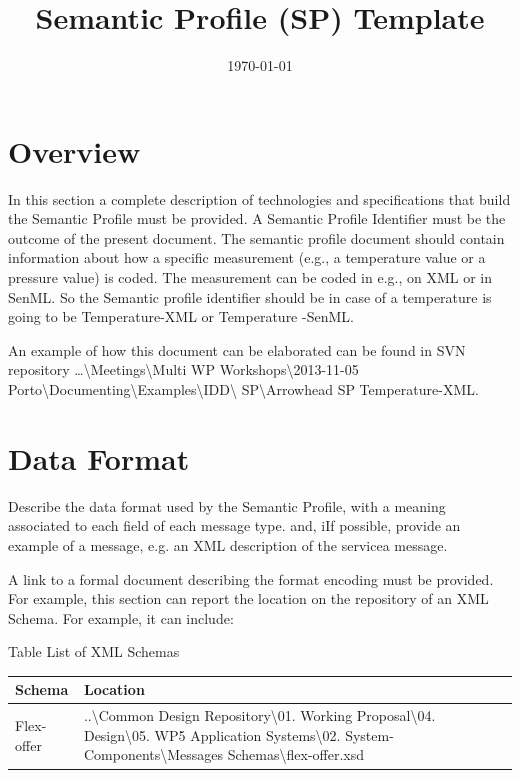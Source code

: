 \documentclass{article}
\date{\today} & 1.2 \\
\title{Semantic Profile (SP) Template}
\newcounter{Table}
\renewcommand\theTable{\arabic{Table}}
\begin{document}
\maketitle
\tableofcontents
\newpage
\section[Overview]{Overview}
In this section a complete description of technologies and specifications that build the Semantic Profile must be provided. A Semantic Profile Identifier must be the outcome of the present document. The semantic profile document should contain information about how a specific measurement (e.g., a temperature value or a pressure value) is coded.  The measurement can be coded in e.g., on XML or in SenML. So the Semantic profile identifier should be in case of a temperature is going to be Temperature-XML or Temperature -SenML.

An example of how this document can be elaborated can be found in SVN repository {\dots}{\textbackslash}Meetings{\textbackslash}Multi WP Workshops{\textbackslash}2013-11-05 Porto{\textbackslash}Documenting{\textbackslash}Examples{\textbackslash}IDD{\textbackslash} SP{\textbackslash}Arrowhead SP Temperature-XML.

\section[Data Format]{Data Format}
Describe the data format used by the Semantic Profile, with a meaning associated to each field of each message type. and, iIf possible, provide an example of a message, e.g. an XML description of the servicea message.

A link to a formal document describing the format encoding must be provided. For example, this section can report the location on the repository of an XML Schema. For example, it can include:

Table \stepcounter{Table}{\theTable} List of XML Schemas

\begin{flushleft}
\tablefirsthead{}
\tablehead{}
\tabletail{}
\tablelasttail{}
\begin{supertabular}{|m{1.6045599in}|m{4.35876in}|}
\hline
{ Schema} &
{ Location}\\\hline
{ Flex-offer} &
{ ..{\textbackslash}Common Design Repository{\textbackslash}01. Working Proposal{\textbackslash}04. Design{\textbackslash}05. WP5 Application Systems{\textbackslash}02. System-Components{\textbackslash}Messages Schemas{\textbackslash}flex-offer.xsd}\\\hline
\end{supertabular}
\end{flushleft}
\end{document}
